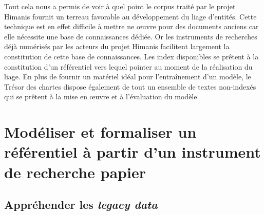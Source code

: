 \documentclass[a4paper,12pt,twoside]{book}
\makeatletter
\newcommand{\parttext}[1]{\def\@parttext{#1}}
\makeatother
\begin{document}
	Tout cela nous a permis de voir à quel point le corpus traité par le projet Himanis fournit un terreau favorable au développement du liage d'entités. Cette technique est en effet difficile à mettre ne œuvre pour des documents anciens car elle nécessite une base de connaissances dédiée. Or les instruments de recherches déjà numérisés par les acteurs du projet Himanis facilitent largement la constitution de cette base de connaissances. Les index disponibles se prêtent à la constitution d'un référentiel vers lequel pointer au moment de la réalisation du liage. En plus de fournir un matériel idéal pour l'entraînement d'un modèle, le Trésor des chartes dispose également de tout un ensemble de textes non-indexés qui se prêtent à la mise en œuvre et à l'évaluation du modèle.
	
	\parttext{L'objectif final du stage que nous avons réalisé étant de préparer l'apprentissage du liage d'entités à partir des données issues du projet Himanis, notre action s'est principalement concentrée sur la création d'un référentiel pouvant servir de base de connaissances. Nous consacrerons donc cette deuxième partie au travail de modélisation et de formalisation de ce référentiel à partir d'un index papier, activité qui a occupé la majeure partie de notre stage. Nous nous sommes concentrés ici sur l'index du premier volume de l'inventaire analytique des registres du Trésor des chartes portant sur les volumes JJ 37 à JJ 50 et paru en 1958. Pour rendre compte de ce travail, nous décrirons dans un premier chapitre les différentes difficultés rencontrées pour comprendre et manipuler cet instrument de recherche. Puis nous dédierons un second chapitre à l'analyse des relations entre les entités. Nous consacrerons enfin un troisième chapitre à la transformation de l'index en une base de données relationnelle.}
	
	\part{Modéliser et formaliser un référentiel à partir d’un instrument de recherche papier}
	
	
	\chapter{Appréhender les \textit{legacy data}}
	
\end{document}
